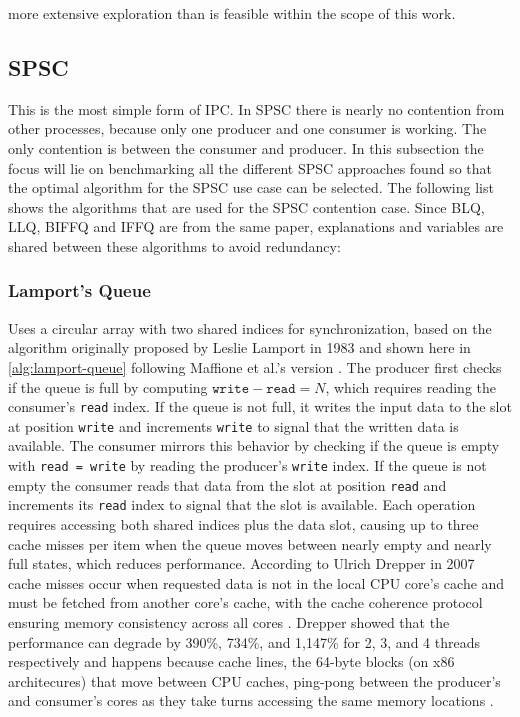 more extensive exploration than is feasible within the scope of this work.

\subsection{\acf{SPSC}}\label{subsec:single-producer-and-single-consumer}
This is the most simple form of \ac{IPC}. In \ac{SPSC} there is nearly no contention from other processes, because only one producer and one consumer is working. The only contention is between the consumer and producer. In this subsection the focus will lie on benchmarking all the different \ac{SPSC} approaches found so that the optimal algorithm for the \ac{SPSC} use case can be selected. The following list shows the algorithms that are used for the \ac{SPSC} contention case. Since \ac{BLQ}, \ac{LLQ}, \ac{BIFFQ} and \ac{IFFQ} are from the same paper, explanations and variables are shared between these algorithms to avoid redundancy:
\subsubsection{Lamport's Queue}
Uses a circular array with two shared indices for synchronization, based on the algorithm originally proposed by Leslie Lamport in 1983 \cite{Lamport1983SPSCCircularBuffer} and shown here in \cref{alg:lamport-queue} following Maffione et al.'s version \cite{MaffioneCacheAware}. The producer first checks if the queue is full by computing $\texttt{write} - \texttt{read} = N$, which requires reading the consumer's \texttt{read} index. If the queue is not full, it writes the input data to the slot at position \texttt{write} and increments \texttt{write} to signal that the written data is available. The consumer mirrors this behavior by checking if the queue is empty with \texttt{read = write} by reading the producer's \texttt{write} index. If the queue is not empty the consumer reads that data from the slot at position \texttt{read} and increments its \texttt{read} index to signal that the slot is available. Each operation requires accessing both shared indices plus the data slot, causing up to three cache misses per item when the queue moves between nearly empty and nearly full states, which reduces performance. According to Ulrich Drepper in 2007 cache misses occur when requested data is not in the local CPU core's cache and must be fetched from another core's cache, with the cache coherence protocol ensuring memory consistency across all cores \cite{drepper2007every}. Drepper showed that the performance can degrade by 390\%, 734\%, and 1,147\% for 2, 3, and 4 threads respectively and happens because cache lines, the 64-byte blocks (on x86 architecures) that move between CPU caches, ping-pong between the producer's and consumer's cores as they take turns accessing the same memory locations \cite{drepper2007every}.

